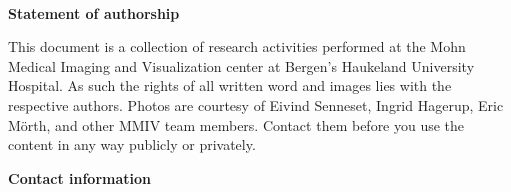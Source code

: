 \documentclass[11pt,fleqn]{book} %
\begin{document}
\renewcommand{\bibname}{Publications} %



\begingroup
\thispagestyle{empty}
\centering
\vspace*{11.3cm}
\par\normalfont\fontsize{35}{35}\sffamily\selectfont

\begin{center}

	
    
    \color{black}\par %
    
    \vspace*{0.5cm}
\end{center}

\endgroup



\newpage
~\vfill
\thispagestyle{empty}

\noindent \textbf{Statement of authorship}
\vspace{0.5cm}

\noindent This document is a collection of research activities performed at the Mohn Medical 
Imaging and Visualization center at Bergen's Haukeland University Hospital. As such the rights
of all written word and images lies with the respective authors. Photos are courtesy of Eivind Senneset, Ingrid Hagerup, Eric Mörth, and other MMIV team members. Contact them before you use the content in any way publicly or privately. 
\vspace{1cm}

\noindent \textbf{Contact information}
\vspace{0.5cm}
\end{document}
